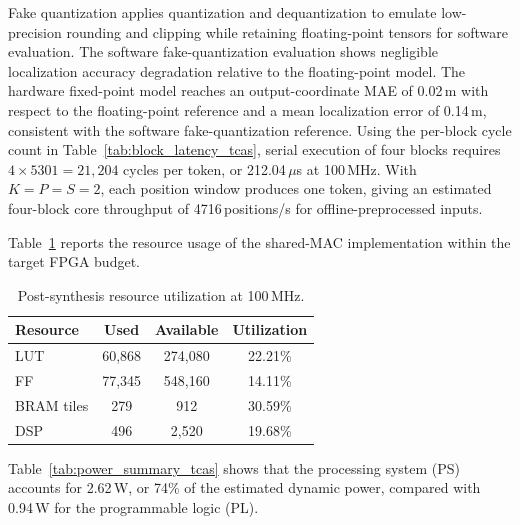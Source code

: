 \documentclass[lettersize,journal]{IEEEtran}
\begin{document}
Fake quantization applies quantization and dequantization to emulate
low-precision rounding and clipping while retaining floating-point tensors
for software evaluation. The software fake-quantization evaluation shows negligible localization
accuracy degradation relative to the floating-point model. The hardware
fixed-point model reaches an output-coordinate MAE of 0.02\,m with respect to
the floating-point reference and a mean localization error of 0.14\,m,
consistent with the software fake-quantization reference. Using the per-block
cycle count in Table~\ref{tab:block_latency_tcas}, serial execution of four
blocks requires $4\times5301=21{,}204$ cycles per token, or
212.04\,\(\mu\)s at 100\,MHz. With $K=P=S=2$, each position window produces
one token, giving an estimated four-block core throughput of
4716\,positions/s for offline-preprocessed inputs.

Table~\ref{tab:resource_utilization_tcas} reports the resource usage of the
shared-MAC implementation within the target FPGA budget.

\begin{table}[!t]
\caption{Post-synthesis resource utilization at 100\,MHz.}
\label{tab:resource_utilization_tcas}
\begin{center}
\footnotesize
\setlength{\tabcolsep}{6pt}
\renewcommand{\arraystretch}{1.08}
\begin{tabular}{|l|c|c|c|}
\hline
\textbf{Resource} & \textbf{Used} & \textbf{Available} & \textbf{Utilization} \\
\hline
LUT & 60,868 & 274,080 & 22.21\% \\
\hline
FF & 77,345 & 548,160 & 14.11\% \\
\hline
BRAM tiles & 279 & 912 & 30.59\% \\
\hline
DSP & 496 & 2,520 & 19.68\% \\
\hline
\end{tabular}
\end{center}
\end{table}

Table~\ref{tab:power_summary_tcas} shows that the processing system (PS)
accounts for 2.62\,W, or 74\% of the estimated dynamic power, compared with
0.94\,W for the programmable logic (PL).
\end{document}
